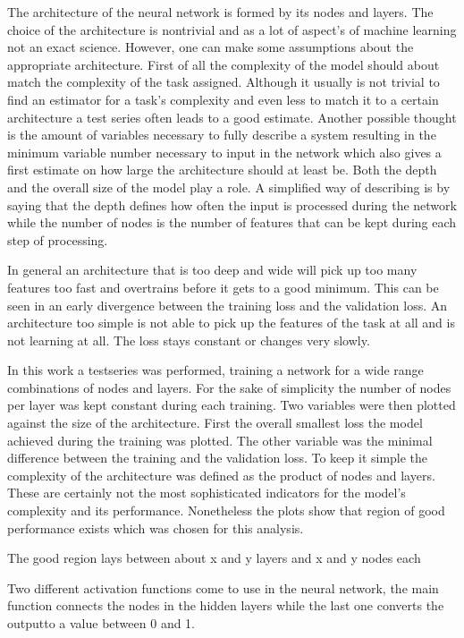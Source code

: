 The architecture of the neural network is formed by its nodes and layers. The choice of the architecture is nontrivial and as a lot of aspect's of machine learning not an exact science.
However, one can make some assumptions about the appropriate architecture.
First of all the complexity of the model should about match the complexity of the task assigned. Although it usually is not trivial to find an estimator for a task's complexity and even less to match it to a certain architecture a test series often leads to a good estimate. Another possible thought is the amount of variables necessary to fully describe a system resulting in the minimum variable number necessary to input in the network which also gives a first estimate on how large the architecture should at least be.
Both the depth and the overall size of the model play a role. A simplified way of describing is by saying that the depth defines how often the input is processed during the network while the number of nodes is the number of features that can be kept during each step of processing.

In general an architecture that is too deep and wide will pick up too many features too fast and overtrains before it gets to a good minimum. This can be seen in an early divergence between the training loss and the validation loss. An architecture too simple is not able to pick up the features of the task at all and is not learning at all. The loss stays constant or changes very slowly.

In this work a testseries was performed, training a network for a wide range combinations of nodes and layers. For the sake of simplicity the number of nodes per layer was kept constant during each training. Two variables were then plotted against the size of the architecture. First the overall smallest loss the model achieved during the training was plotted. The other variable was the minimal difference between the training and the validation loss. To keep it simple the complexity of the architecture was defined as the product of nodes and layers. These are certainly not the most sophisticated indicators for the model's complexity and its performance. Nonetheless the plots show that region of good performance exists which was chosen for this analysis.

The good region lays between about x and y layers and x and y nodes each

Two different activation functions come to use in the neural network, the main function connects the nodes in the hidden layers while the last one converts the outputto a value between \num{0} and \num{1}. 

